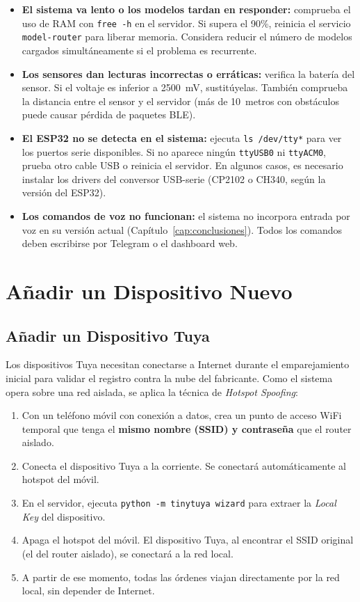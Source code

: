 \begin{itemize}
    \item \textbf{El sistema va lento o los modelos tardan en responder:} comprueba el uso de RAM con \texttt{free -h} en el servidor. Si supera el 90\%, reinicia el servicio \texttt{model-router} para liberar memoria. Considera reducir el número de modelos cargados simultáneamente si el problema es recurrente.

    \item \textbf{Los sensores dan lecturas incorrectas o erráticas:} verifica la batería del sensor. Si el voltaje es inferior a 2500~mV, sustitúyelas. También comprueba la distancia entre el sensor y el servidor (más de 10~metros con obstáculos puede causar pérdida de paquetes BLE).

    \item \textbf{El ESP32 no se detecta en el sistema:} ejecuta \texttt{ls /dev/tty*} para ver los puertos serie disponibles. Si no aparece ningún \texttt{ttyUSB0} ni \texttt{ttyACM0}, prueba otro cable USB o reinicia el servidor. En algunos casos, es necesario instalar los drivers del conversor USB-serie (CP2102 o CH340, según la versión del ESP32).

    \item \textbf{Los comandos de voz no funcionan:} el sistema no incorpora entrada por voz en su versión actual (Capítulo~\ref{cap:conclusiones}). Todos los comandos deben escribirse por Telegram o el dashboard web.
\end{itemize}

\section{Añadir un Dispositivo Nuevo}

\subsection{Añadir un Dispositivo Tuya}

Los dispositivos Tuya necesitan conectarse a Internet durante el emparejamiento inicial para validar el registro contra la nube del fabricante. Como el sistema opera sobre una red aislada, se aplica la técnica de \textit{Hotspot Spoofing}:

\begin{enumerate}
    \item Con un teléfono móvil con conexión a datos, crea un punto de acceso WiFi temporal que tenga el \textbf{mismo nombre (SSID) y contraseña} que el router aislado.
    \item Conecta el dispositivo Tuya a la corriente. Se conectará automáticamente al hotspot del móvil.
    \item En el servidor, ejecuta \texttt{python -m tinytuya wizard} para extraer la \textit{Local Key} del dispositivo.
    \item Apaga el hotspot del móvil. El dispositivo Tuya, al encontrar el SSID original (el del router aislado), se conectará a la red local.
    \item A partir de ese momento, todas las órdenes viajan directamente por la red local, sin depender de Internet.
\end{enumerate}

